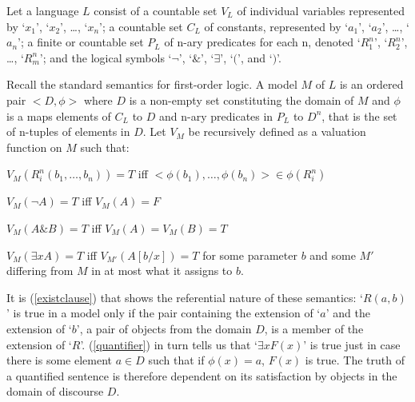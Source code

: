 Let a language $L$ consist of a countable set $V_L$ of individual
variables represented by `$x_1$', `$x_2$', \ldots, `$x_n$'; a
countable set $C_L$ of constants, represented by `$a_1$', `$a_2$',
\ldots, `$a_n$'; a finite or countable set $P_L$ of n-ary predicates for
each n, denoted `$R^n_1$', `$R^n_2$', \ldots, `$R^n_m$'; and the
logical symbols `$\neg$', `$\&$', `$\exists$', `$($', and `$)$'.

Recall the standard semantics for first-order logic.  A model $M$ of
$L$ is an ordered pair $<D,\phi>$ where $D$ is a non-empty set
constituting the domain of $M$ and $\phi$ is a maps elements
of $C_L$ to $D$ and n-ary predicates in $P_L$ to $D^n$,
that is the set of n-tuples of elements in $D$.  Let $V_M$ be
recursively defined as a valuation function on $M$ such that:

\begin{te}
  $V_M(R^n_i(b_1,\ldots ,b_n)) = T$ iff $< \phi(b_1),\ldots ,\phi(b_n) > \in
  \phi(R^n_i)$
\label{existclause}
\end{te}
\begin{te}
  $V_M(\neg A) = T$ iff $V_M(A) = F$
\end{te}
\begin{te}
  $V_M(A \& B) = T$ iff $V_M(A) = V_M(B) = T$
\end{te}\begin{te}
  $V_M(\exists xA) = T$ iff $V_{M'}(A[b/x]) = T$ for some
  parameter $b$ and some $M'$ differing from $M$ in at most what it
  assigns to $b$.\\
\label{quantifier}
\end{te}

It is (\ref{existclause}) that shows the referential nature of these
semantics: `$R(a,b)$' is true in a model only if the pair containing
the extension of `$a$' and the extension of `$b$', a pair of objects
from the domain $D$, is a member of the extension of
`$R$'. (\ref{quantifier}) in turn tells us that `$\exists xF(x)$' is true
just in case there is some element $a \in D$ such that if $\phi(x) =
{a}$, $F(x)$ is true.  The truth of a quantified sentence is therefore
dependent on its satisfaction by objects in the domain of discourse $D$.


